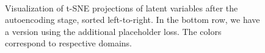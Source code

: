 \begin{figure}[h]
\hfill
{}\\
\caption{Visualization of t-SNE projections of latent variables after the autoencoding stage, sorted left-to-right. In the bottom row, we have a version using the additional placeholder loss. The colors correspond to respective domains.}
\label{05:fig:ae-layers}
\end{figure}

